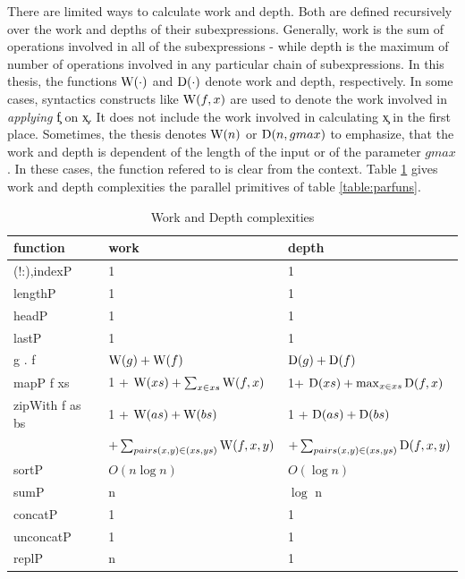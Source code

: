   There are limited ways to calculate work and depth. Both are defined
  recursively over the work and depths of their subexpressions. Generally,
  work is the sum of operations involved in all of the subexpressions
  - while depth is the maximum of number of operations involved in
  any particular chain of subexpressions.
  In this thesis, the functions $\textrm{W}(\cdot)$ and $\textrm{D}(\cdot)$ denote work
  and depth, respectively. In some cases, syntactics constructs
  like $\textrm{W}(f,x)$ are used to denote the work involved in \emph{applying}
  \c{f} on \c{x}. It does not include the work involved
  in calculating \c{x} in the first place. Sometimes,
  the thesis denotes $\textrm{W}(n)$ or $\textrm{D}(n,gmax)$ to emphasize,
  that the work and depth is dependent of the length of the input
  or of the parameter $gmax$. In these cases, the function refered to
  is clear from the context.
  Table \ref{table:workdepth} gives work and depth complexities the parallel primitives
  of table \ref{table:parfuns}.
  
  \begin{table}[h]
    \caption{Work and Depth complexities}
    \label{table:workdepth}
    \begin{center}
    \begin{tabular}{lll}
      \toprule
      function & work & depth \\
      \midrule
      (!:),indexP & 1 & 1 \\
      lengthP & 1 & 1 \\
      headP & 1 & 1 \\
      lastP & 1 & 1 \\
      g . f & $\textrm{W}(g) + \textrm{W}(f)$ & $\textrm{D}(g) + \textrm{D}(f)$ \\
      mapP f xs & 1 + $\textrm{W}(xs) + \sum_{x \in xs}\textrm{W}(f,x)$ & 1+ $\textrm{D}(xs) + \max_{x \in xs}\textrm{D}(f,x)$ \\
      zipWith f as bs & 1 + $\textrm{W}(as) + \textrm{W}(bs)$ & 1 + $\textrm{D}(as) + \textrm{D}(bs)$ \\
        & $+ \sum_{pairs (x,y) \in (xs,ys)}\textrm{W}(f,x,y)$ & $ + \sum_{pairs (x,y) \in (xs,ys)}\textrm{D}(f,x,y)$ \\
      sortP & $O(n \log n)$ & $O(\log n)$ \\
      sumP & n & $\log$ n \\
      concatP & 1 & 1 \\
      unconcatP & 1 & 1 \\
      replP &  n & 1 \\
    \end{tabular}
    \end{center}
  \end{table}
  
